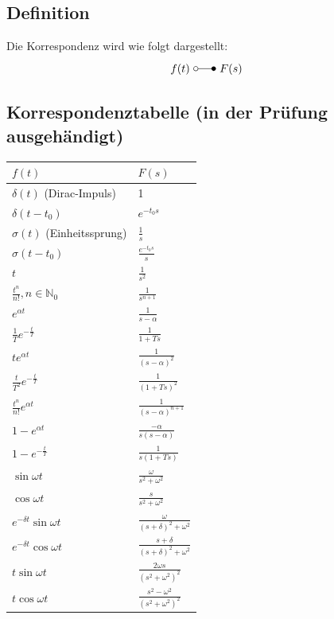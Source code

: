 \documentclass[10pt,a4paper]{article}
\begin{document}
\subsection{Definition}
Die Korrespondenz wird wie folgt dargestellt:
$$
	f(t) ~\laplace ~F(s)
$$

\pagebreak

\begin{multicols}{2}
\subsection{Korrespondenztabelle (in der Prüfung ausgehändigt)} 

\begin{tabularx}{\columnwidth}{|X|X|}
	\hline
	$f(t)$ & $F(s)$ \\
	\hline
	\hline
	$\delta(t)$ (Dirac-Impuls)& 1 \\
	\hline
	$\delta(t - t_0)$ & $e^{-t_0 s}$ \\
	\hline
	$\sigma(t)$ (Einheitssprung) & $\frac 1 s$ \\
	\hline
	$\sigma(t - t_0)$ & $\frac{e^{-t_0 s}}{s}$ \\
	\hline
	$t$ & $\frac{1}{s^2}$ \\
	\hline
	$\frac{t^n}{n!}, n \in \mathbb{N}_0$ & $\frac{1}{s^{n + 1}}$ \\
	\hline
	$e^{\alpha t}$ & $\frac{1}{s - \alpha}$ \\
	\hline
	$\frac 1 T e^{-\frac t T}$ & $\frac{1}{1 + Ts}$ \\
	\hline
	$te^{\alpha t}$ & $\frac{1}{(s - \alpha)^2}$ \\
	\hline
	$\frac{t}{T^2} e^{- \frac t T}$ & $\frac{1}{(1 + Ts)^2}$ \\
	\hline
	$\frac{t^n}{n!}e^{\alpha t}$ & $\frac{1}{(s - \alpha)^{n + 1}}$ \\
	\hline
	$1 - e^{\alpha t}$ & $\frac{-\alpha}{s(s - \alpha)}$ \\
	\hline
	$1 - e^{-\frac{t}{T}}$ & $\frac{1}{s(1 + Ts)}$ \\
	\hline
	$\sin \omega t$ & $\frac{\omega}{s^2 + \omega^2}$ \\
	\hline
	$\cos \omega t$ & $\frac{s}{s^2 + \omega^2}$ \\
	\hline
	$e^{-\delta t}\sin \omega t$ & $\frac{\omega}{(s + \delta)^2 + \omega^2}$ \\
	\hline
	$e^{-\delta t}\cos \omega t$ & $\frac{s + \delta}{(s + \delta)^2 + \omega^2}$ \\
	\hline
	$t \sin \omega t$ & $\frac{2 \omega s}{(s^2 + \omega^2)^2}$ \\
	\hline
	$t \cos \omega t$ & $\frac{s^2 - \omega^2}{(s^2 + \omega^2)^2}$ \\
	\hline	
\end{tabularx} \\
\\


\end{multicols}
\end{document}
